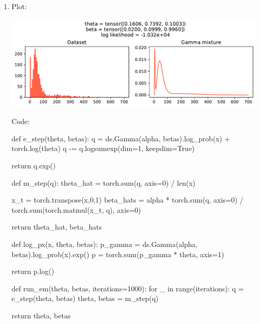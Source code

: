 \documentclass[submit]{harvardml}
\begin{document}
\begin{enumerate}
  \newpage
  \item 
    Plot:

    \includegraphics[width=\linewidth]{p1}

    Code:

    \begin{python}
def e_step(theta, betas):
    q = ds.Gamma(alpha, betas).log_prob(x) + torch.log(theta)
    q -= q.logsumexp(dim=1, keepdim=True)
    
    return q.exp()


def m_step(q):
    theta_hat = torch.sum(q, axis=0) / len(x)
    
    x_t = torch.transpose(x,0,1)
    beta_hats = alpha * torch.sum(q, axis=0) / torch.sum(torch.matmul(x_t, q), axis=0)

    return theta_hat, beta_hats


def log_px(x, theta, betas):
    p_gamma = ds.Gamma(alpha, betas).log_prob(x).exp()
    p = torch.sum(p_gamma * theta, axis=1)
    
    return p.log()


def run_em(theta, betas, iterations=1000):
    for _ in range(iterations):
        q = e_step(theta, betas)
        theta, betas = m_step(q)
        
    return theta, betas
    \end{python}
\end{enumerate}


\newpage
\end{document}
